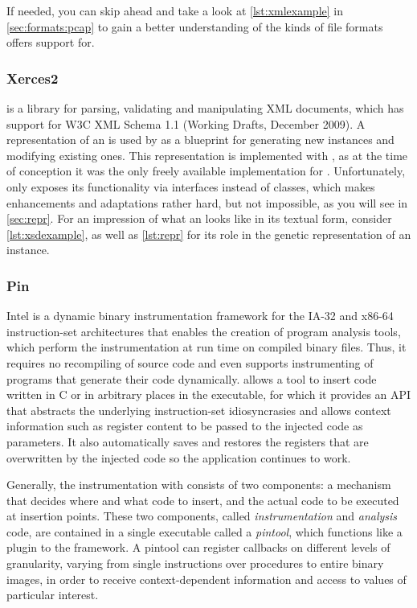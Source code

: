 If needed, you can skip ahead and take a look at \cref{lst:xmlexample} in \cref{sec:formats:pcap}
to gain a better understanding of the kinds of file formats \xom offers support for.
\tocless\subsubsection{Xerces2}
\xerces{}\cite{xerces} is a \java library for parsing, validating and manipulating XML documents, which has
support for W3C XML Schema 1.1 (Working Drafts, December 2009). A representation of an \xsd is used by \xmlmate
as a blueprint for generating new \xml instances and modifying existing ones. This representation is
implemented with \xerces, as at the time of conception it was the only freely available \xsd implementation
for \java. Unfortunately, \xerces only exposes its functionality via interfaces instead of classes, which
makes enhancements and adaptations rather hard, but not impossible, as you will see in \cref{sec:repr}.
For an impression of what an \xsd looks like in its textual form, consider \cref{lst:xsdexample},
as well as \cref{lst:repr} for its role in the genetic representation of an \xml instance.
\tocless\subsubsection{Pin}
Intel \pin\cite{Luk05pin:building} is a dynamic binary instrumentation framework for the IA-32 and x86-64 instruction-set architectures 
that enables the creation of program analysis tools, which perform the instrumentation at run time on  
compiled binary files. Thus, it requires no recompiling of source code and even supports instrumenting
of programs that generate their code dynamically.
\pin allows a tool to insert code written in C or \cpp in arbitrary places in the executable, for which it 
provides an API that abstracts the underlying instruction-set idiosyncrasies and allows
context information such as register content to be passed to the injected code as parameters. It also
automatically saves and restores the registers that are overwritten by the injected code so the application
continues to work.

Generally, the instrumentation with \pin consists of two components: a mechanism that decides where and what code to insert, 
and the actual code to be executed at insertion points. These two components, called \emph{instrumentation} and
\emph{analysis} code, are contained in a single executable called a \emph{pintool}, which functions like a
plugin to the \pin framework.
A pintool can register callbacks on different levels of granularity, varying from single instructions over procedures
to entire binary images, in order to receive context-dependent information and access to values of particular interest.

